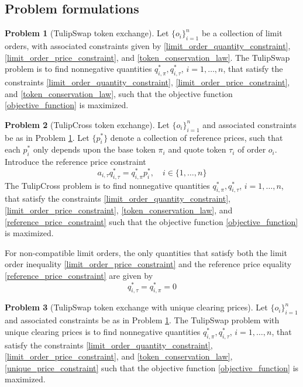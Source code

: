 \documentclass[11pt, reqno]{amsart}
\theoremstyle{definition}
\newtheorem{problem}{Problem}[subsection]
\theoremstyle{remark}
\begin{document}
\subsection{Problem formulations}

\begin{problem}[TulipSwap token exchange]\label{problem_tulipswap}
Let $\{o_i\}_{i = 1}^n$ be a collection of limit orders, with associated
constraints given by \eqref{limit_order_quantity_constraint},
\eqref{limit_order_price_constraint}, and \eqref{token_conservation_law}.
The TulipSwap problem is to find nonnegative quantities
$q_{i, \pi}^*, q_{i, \tau}^*$, $i = 1, \ldots, n$, that satisfy the constraints
\eqref{limit_order_quantity_constraint},
\eqref{limit_order_price_constraint}, and \eqref{token_conservation_law},
such that the objective function \eqref{objective_function} is maximized.
\end{problem}

\begin{problem}[TulipCross token exchange]\label{problem_tulipcross}
Let $\{o_i\}_{i = 1}^n$ and associated constraints be as in Problem
\ref{problem_tulipswap}.
Let $\{p_i^*\}$ denote a collection of reference prices, such that
each $p_i^*$ only depends upon the base token $\pi_i$ and quote
token $\tau_i$ of order $o_i$.
Introduce the reference price constraint
\begin{equation}\label{reference_price_constraint}
    a_{i, \tau} q_{i, \tau}^* = q_{i, \pi}^* p_i^*, \quad i \in \{1, \ldots, n\}
\end{equation}
The TulipCross problem is to find nonnegative quantities
$q_{i, \pi}^*, q_{i, \tau}^*$, $i = 1, \ldots, n$, that satisfy the constraints
\eqref{limit_order_quantity_constraint},
\eqref{limit_order_price_constraint}, \eqref{token_conservation_law},
and
\eqref{reference_price_constraint}
such that the objective function \eqref{objective_function} is maximized.
\end{problem}
For non-compatible limit orders, the only quantities that satisfy both the
limit order inequality \eqref{limit_order_price_constraint} and the reference
price equality \eqref{reference_price_constraint} are given by
\[
    q_{i, \tau}^* = q_{i, \pi}^* = 0
\]

\begin{problem}[TulipSwap token exchange with unique clearing prices]
\label{problem_tulipswap_with_unique_prices}
Let $\{o_i\}_{i = 1}^n$ and associated constraints be as in Problem
\ref{problem_tulipswap}.
The TulipSwap problem with unique clearing prices is to find nonnegative
quantities $q_{i, \pi}^*, q_{i, \tau}^*$, $i = 1, \ldots, n$, that satisfy the
constraints \eqref{limit_order_quantity_constraint},
\eqref{limit_order_price_constraint}, and \eqref{token_conservation_law},
\eqref{unique_price_constraint}
such that the objective function \eqref{objective_function} is maximized.
\end{problem}
\end{document}

